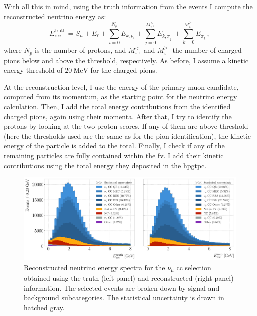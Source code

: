 With all this in mind, using the truth information from the events I compute the reconstructed neutrino energy as:
\begin{equation}
    E^{\mathrm{truth}}_{\mathrm{rec}} = S_{n} + E_{\ell} + \sum_{i=0}^{N_{p}} E_{k,p_{i}} + \sum_{j=0}^{M_{\pi^{\pm}}^{<}} E_{k,\pi^{\pm}_{j}} + \sum_{k=0}^{M_{\pi^{\pm}}^{\geq}} E_{\pi^{\pm}_{k}},
\end{equation}
where $N_{p}$ is the number of protons, and $M_{\pi^{\pm}}^{<}$ and $M_{\pi^{\pm}}^{\geq}$ the number of charged pions below and above the threshold, respectively. As before, I assume a kinetic energy threshold of $20~\mathrm{MeV}$ for the charged pions.

At the reconstruction level, I use the energy of the primary muon candidate, computed from its momentum, as the starting point for the neutrino energy calculation. Then, I add the total energy contributions from the identified charged pions, again using their momenta. After that, I try to identify the protons by looking at the two proton scores. If any of them are above threshold (here the thresholds used are the same as for the pion identification), the kinetic energy of the particle is added to the total. Finally, I check if any of the remaining particles are fully contained within the \gls{fv}. I add their kinetic contributions using the total energy they deposited in the \gls{hpgtpc}.

\begin{figure}[t]
    \centering
    \includegraphics[width=.99\linewidth]{Images/GAr_selection/numuCC_selection_reco_energy_comparison.pdf}
    \caption[Reconstructed neutrino energy spectra for the $\nu_{\mu}$ \gls{cc} selection obtained using the truth and reconstructed information]{Reconstructed neutrino energy spectra for the $\nu_{\mu}$ \gls{cc} selection obtained using the truth (left panel) and reconstructed (right panel) information. The selected events are broken down by signal and background subcategories. The statistical uncertainty is drawn in hatched gray.}
    \label{fig:numuCC_reconstructed_energy}
\end{figure}


